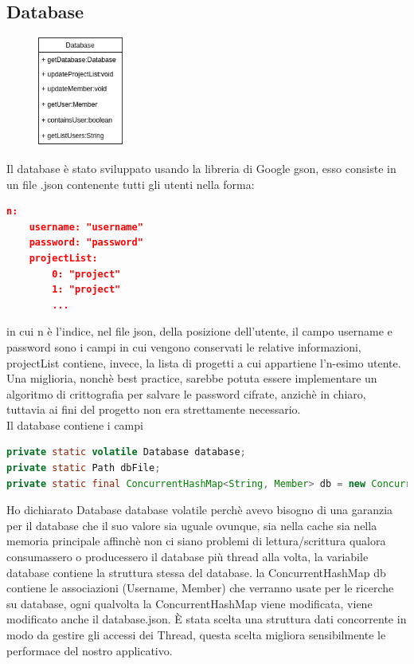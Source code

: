 \documentclass[]{article}
\begin{document}
\subsection{Database}
\begin{figure} %
	\centering
	\includegraphics[width=0.25\textwidth]{databaseDiagram}
\end{figure}
Il database è stato sviluppato usando la libreria di Google gson, esso consiste in un file .json contenente tutti gli utenti nella forma:
\begin{lstlisting}[language=json]
n:
	username: "username"
	password: "password"
	projectList:
		0: "project"
		1: "project"
		...
\end{lstlisting}
in cui n è l'indice, nel file json, della posizione dell'utente, il campo username e password sono i campi in cui vengono conservati le relative informazioni, projectList contiene, invece, la lista di progetti a cui appartiene l'n-esimo utente.
Una miglioria, nonchè best practice, sarebbe potuta essere implementare un algoritmo di crittografia per salvare le password cifrate, anzichè in chiaro, tuttavia ai fini del progetto non era strettamente necessario.\\
Il database contiene i campi
\begin{lstlisting}[language=java]
private static volatile Database database;
private static Path dbFile;
private static final ConcurrentHashMap<String, Member> db = new ConcurrentHashMap<>();
\end{lstlisting}
Ho dichiarato Database database volatile perchè avevo bisogno di una garanzia per il database che il suo valore sia uguale ovunque, sia nella cache sia nella memoria principale affinchè non ci siano problemi di lettura/scrittura qualora consumassero o producessero il database più thread alla volta,
la variabile database contiene la struttura stessa del database.
la ConcurrentHashMap db contiene le associazioni (Username, Member) che verranno usate per le ricerche su database, ogni qualvolta la ConcurrentHashMap viene modificata, viene modificato anche il database.json. È stata scelta una struttura dati concorrente in modo da gestire gli accessi dei Thread, questa scelta migliora sensibilmente le performace del nostro applicativo.
\end{document}
